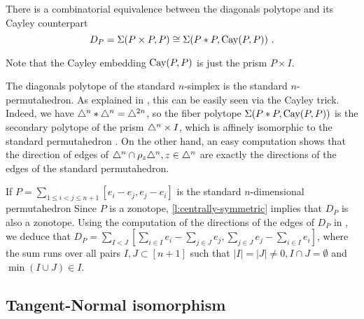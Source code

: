 \begin{lemma}
	\label{l:cayleytrick}
	There is a combinatorial equivalence between the diagonals polytope and its Cayley counterpart
	\[
		D_P=\Sigma(P\times P,P) \cong \Sigma(P*P,\operatorname{Cay}(P,P))  \ .
	\]
\end{lemma}
Note that the Cayley embedding $\operatorname{Cay}(P,P)$ is just the prism $P \times I$.

\begin{example}
\label{e:simplex-permutahedron}
	The diagonals polytope of the standard $n$-simplex is the standard $n$-permutahedron.
	As explained in \cite[Example 9.2.20]{deloeraTriangulations2010}, this can be easily seen via the Cayley trick.
	Indeed, we have $\triangle^n * \triangle^n = \triangle^{2n}$, so the fiber polytope $\Sigma(P*P,\operatorname{Cay}(P,P))$ is the secondary polytope of the prism $\triangle^n \times I$, which is affinely isomorphic to the standard permutahedron \cite[Theorem 6.2.6]{deloeraTriangulations2010}.
	On the other hand, an easy computation shows that the direction of edges of $\triangle^n \cap \rho_z \triangle^n, z \in \triangle^n$ are exactly the directions of the edges of the standard permutahedron.
\end{example}

\begin{example}
\label{e:permutahedron}
	If $P=\sum_{1 \leq i<j \leq n+1} [e_i-e_j, e_j-e_i]$ is the standard $n$-dimensional permutahedron
	Since $P$ is a zonotope, \cref{l:centrally-symmetric} implies that $D_P$ is also a zonotope.
	Using the computation of the directions of the edges of $D_P$ in \cite[Theorem 3.6]{GLA21}, we deduce that $D_P=\sum_{I<J} [\sum_{i \in I}e_i - \sum_{j \in J}e_j, \sum_{j \in J} e_j - \sum_{i \in I}e_i]$, where the sum runs over all pairs $I,J\subset [n+1]$ such that $|I|=|J|\neq 0, I\cap J = \emptyset$ and $\min(I \cup J) \in I$.
\end{example}

\subsection{Tangent-Normal isomorphism}

